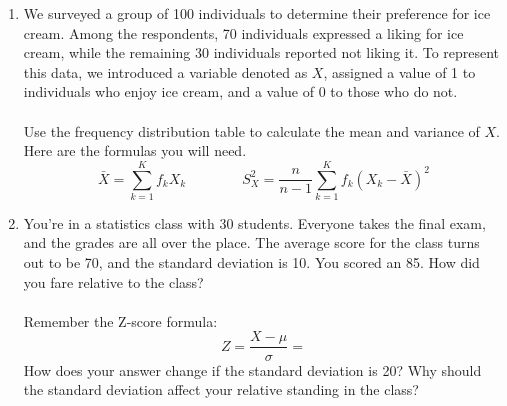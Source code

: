 \documentclass{./../../Latex/handout}
\begin{document}
\thispagestyle{plain}
\begin{center}
\end{center}	

\begin{enumerate}
\item We surveyed a group of 100 individuals to determine their preference for ice cream. Among the respondents, 70 individuals expressed a liking for ice cream, while the remaining 30 individuals reported not liking it. To represent this data, we introduced a variable denoted as $X$, assigned a value of 1 to individuals who enjoy ice cream, and a value of 0 to those who do not.  \\~\\
Use the frequency distribution table to calculate the mean and variance of $X$. Here are the formulas you will need.
$$ \bar{X} = \sum_{k=1}^K f_k X_k \quad \quad \quad \quad S^2_X = \frac{n}{n-1} \sum_{k=1}^K f_k (X_k-\bar{X})^2 $$

\newpage
\item You're in a statistics class with 30 students. Everyone takes the final exam, and the grades are all over the place. The average score for the class turns out to be 70, and the standard deviation is 10. You scored an 85. How did you fare relative to the class? \\~\\
Remember the Z-score formula:
$$ Z = \frac{X-\mu}{\sigma} =  $$
How does your answer change if the standard deviation is 20? Why should the standard deviation affect your relative standing in the class?
\end{enumerate}
\end{document}
